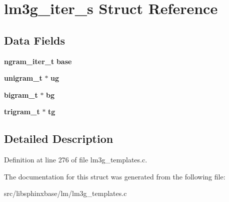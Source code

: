 \section{lm3g\-\_\-iter\-\_\-s Struct Reference}
\label{structlm3g__iter__s}
\subsection*{Data Fields}
\begin{DoxyCompactItemize}
\item 
{\bf ngram\-\_\-iter\-\_\-t} {\bfseries base}\label{structlm3g__iter__s_ae24753ad344180c9b3a6162444ecbc3c}

\item 
{\bf unigram\-\_\-t} $\ast$ {\bfseries ug}\label{structlm3g__iter__s_a8a4ce73a4ae6d75de2682c84ae345b1b}

\item 
{\bf bigram\-\_\-t} $\ast$ {\bfseries bg}\label{structlm3g__iter__s_a484e0af0540b59dced50e8f39a7bf691}

\item 
{\bf trigram\-\_\-t} $\ast$ {\bfseries tg}\label{structlm3g__iter__s_af8d3b111d9a5f98c1e2830866c72658a}

\end{DoxyCompactItemize}


\subsection{Detailed Description}


Definition at line 276 of file lm3g\-\_\-templates.\-c.



The documentation for this struct was generated from the following file\-:\begin{DoxyCompactItemize}
\item 
src/libsphinxbase/lm/lm3g\-\_\-templates.\-c\end{DoxyCompactItemize}
